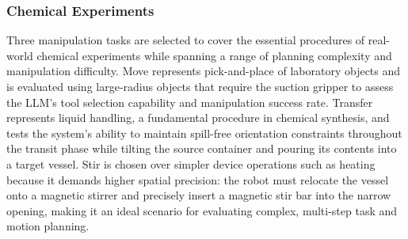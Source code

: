 \documentclass{ieeeaccess}
\begin{document}
\subsubsection{Chemical Experiments}\label{sec:4.1.2}
Three manipulation tasks are selected to cover the essential procedures of real-world chemical experiments while spanning a range of planning complexity and manipulation difficulty. Move represents pick-and-place of laboratory objects and is evaluated using large-radius objects that require the suction gripper to assess the LLM's tool selection capability and manipulation success rate. Transfer represents liquid handling, a fundamental procedure in chemical synthesis, and tests the system's ability to maintain spill-free orientation constraints throughout the transit phase while tilting the source container and pouring its contents into a target vessel. Stir is chosen over simpler device operations such as heating because it demands higher spatial precision: the robot must relocate the vessel onto a magnetic stirrer and precisely insert a magnetic stir bar into the narrow opening, making it an ideal scenario for evaluating complex, multi-step task and motion planning.
\end{document}
